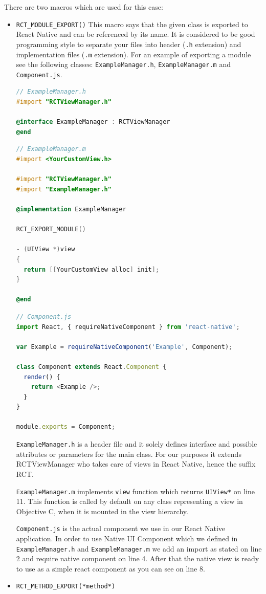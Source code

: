 \documentclass[thesis=M,english]{FITthesis}[2012/10/20]
\begin{document}
There are two macros which are used for this case:

\begin{itemize}
\item  \verb|RCT_MODULE_EXPORT()| 
This macro says that the given class is exported to React Native and can be referenced by its name. It is considered to be good programming style to separate your files into header (\verb|.h| extension) and implementation files (\verb|.m| extension). For an example of exporting a module see the following classes: \verb|ExampleManager.h|, \verb|ExampleManager.m| and \verb|Component.js|.


\begin{lstlisting}[language=C]
// ExampleManager.h
#import "RCTViewManager.h"

@interface ExampleManager : RCTViewManager
@end

\end{lstlisting}

\begin{lstlisting}[language=C]
// ExampleManager.m
#import <YourCustomView.h>

#import "RCTViewManager.h"
#import "ExampleManager.h"

@implementation ExampleManager

RCT_EXPORT_MODULE()

- (UIView *)view
{
  return [[YourCustomView alloc] init];
}

@end
\end{lstlisting}

\begin{lstlisting}[language=javascript]
// Component.js
import React, { requireNativeComponent } from 'react-native';

var Example = requireNativeComponent('Example', Component);

class Component extends React.Component {
  render() {
    return <Example />;
  }
}

module.exports = Component;
\end{lstlisting}
  
  \verb|ExampleManager.h| is a header file and it solely defines interface and possible attributes or parameters for the main class. For our purposes it extends RCTViewManager who takes care of views in React Native, hence the suffix RCT.
  
  \verb|ExampleManager.m| implements \verb|view| function which returns \verb|UIView*| on line 11. This function is called by default on any class representing a view in Objective C, when it is mounted in the view hierarchy.
  
  \verb|Component.js| is the actual component we use in our React Native application. In order to use Native UI Component which we defined in  \verb|ExampleManager.h| and \verb|ExampleManager.m| we add an import as stated on line 2 and require native component on line 4. After that the native view is ready to use as a simple react component as you can see on line 8.
  
\item  \verb|RCT_METHOD_EXPORT(*method*)|

\end{itemize}
\end{document}
